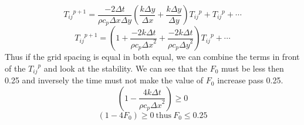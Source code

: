 \begin{enumerate}
    \begin{equation}
        { { T }_{ ij } }^{ p+1 }=\frac { -2\Delta t }{ \rho { c }_{ p }\Delta x\Delta y } \left( \frac { k\Delta y }{ \Delta x } +\frac { k\Delta y }{ \Delta y }  \right) { { T }_{ ij } }^{ p }+{ { T }_{ ij } }^{ p }+\cdots
    \end{equation}
    \begin{equation}
        { { T }_{ ij } }^{ p+1 }=\left( 1+\frac { -2k\Delta t }{ { \rho { c }_{ p }\Delta x }^{ 2 } } +\frac { -2k\Delta t }{ { \rho { c }_{ p }\Delta y }^{ 2 } }  \right) { { T }_{ ij } }^{ p }+\cdots 
    \end{equation}
    Thus if the grid spacing is equal in both equal, we can combine the terms in front of the ${ { T }_{ ij } }^{ p }$ and look at the stability. We can see that the $F_{0}$ must be less then 0.25 and inversely the time must not make the value of $F_{0}$ increase pass 0.25.
    \begin{equation}
        \left( 1-\frac { 4k\Delta t }{ { \rho { c }_{ p }\Delta x }^{ 2 } }  \right) \geq 0
    \end{equation}
    \begin{equation}
        \left( 1-4{ F }_{ 0 } \right) \geq 0\ \text{thus}\ { F }_{ 0 }\le 0.25
    \end{equation}

\end{enumerate}
